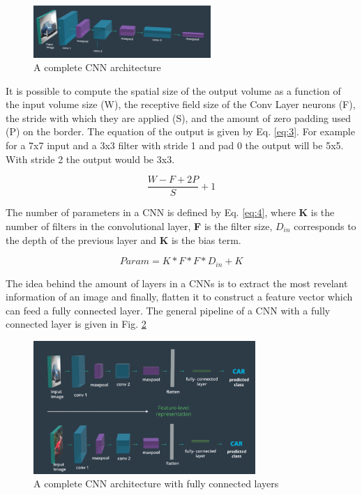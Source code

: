 \documentclass{article}
\begin{document}
\begin{figure}[ht]
    \centering
    \includegraphics[width=0.6\textwidth,height=0.6\textheight,keepaspectratio]{images/full_cnn.png}
    \captionsetup{justification=centering}
    \caption{A complete CNN architecture}
    \label{fig:f24}
\end{figure}


It is possible to compute the spatial size of the output volume as a function of the input volume size (W), the receptive field size of the Conv Layer neurons (F), the stride with which they are applied (S), and the amount of zero padding used (P) on the border. The equation of the output is given by Eq. \eqref{eq:3}. For example for a 7x7 input and a 3x3 filter with stride 1 and pad 0 the output will be 5x5. With stride 2 the output would be 3x3.

\begin{equation}
\frac{W - F + 2P} {S} + 1
\label{eq:3}
\end{equation}

The number of parameters in a CNN is defined by Eq. \eqref{eq:4}, where \textbf{K} is the number of filters in the convolutional layer, \textbf{F} is the filter size, \textbf{\(D_{in}\)} corresponds to the depth of the previous layer and \textbf{K} is the bias term.

\begin{equation}
Param = K * F * F * D_{in}  + K
\label{eq:4}
\end{equation}

The idea behind the amount of layers in a CNNs is to extract the most revelant information of an image and finally, flatten it to construct a feature vector which can feed a fully connected layer. The general pipeline of a CNN with a fully connected layer is given in Fig. \ref{fig:f25}

\begin{figure}[ht]
    \centering
    \includegraphics[width=0.75\textwidth,height=0.75\textheight,keepaspectratio]{images/fcn.png}
    \captionsetup{justification=centering}
    \caption{A complete CNN architecture with fully connected layers}
    \label{fig:f25}
\end{figure}
\end{document}
